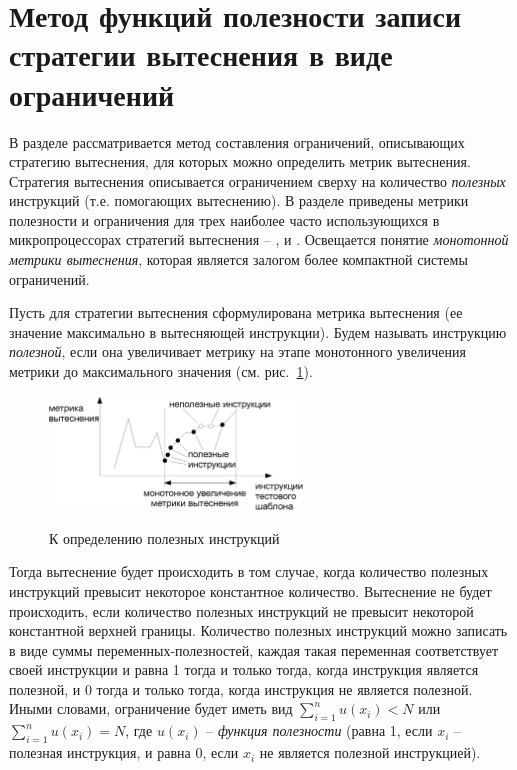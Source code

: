 
\pagebreak
\section{Метод функций полезности записи стратегии вытеснения в виде
ограничений}

В разделе рассматривается метод составления ограничений, описывающих
стратегию вытеснения, для которых можно определить метрик
вытеснения. Стратегия вытеснения описывается ограничением сверху на
количество \emph{полезных} инструкций (т.е. помогающих вытеснению).
В разделе приведены метрики полезности и ограничения для трех
наиболее часто использующихся в микропроцессорах стратегий
вытеснения -- \LRU, \FIFO и \PseudoLRU. Освещается понятие
\emph{монотонной метрики вытеснения}, которая является залогом более
компактной системы ограничений.

Пусть для стратегии вытеснения сформулирована метрика вытеснения (ее
значение максимально в вытесняющей инструкции). Будем называть
инструкцию \emph{полезной}, если она увеличивает метрику на этапе
монотонного увеличения метрики до максимального значения (см.
рис.~\ref{useful}).

\begin{figure}[h] \center
  \includegraphics[width=0.6\textwidth]{2.theor/useful}\\
  \caption{К определению полезных инструкций}\label{useful}
\end{figure}

Тогда вытеснение будет происходить в том случае, когда количество
полезных инструкций превысит некоторое константное количество.
Вытеснение не будет происходить, если количество полезных инструкций
не превысит некоторой константной верхней границы. Количество
полезных инструкций можно записать в виде суммы
переменных-полезностей, каждая такая переменная соответствует своей
инструкции и равна 1 тогда и только тогда, когда инструкция является
полезной, и 0 тогда и только тогда, когда инструкция не является
полезной. Иными словами, ограничение будет иметь вид $\sum_{i=1}^n
u(x_i) < N$ или $\sum_{i=1}^n u(x_i) = N$, где $u(x_i)$ --
\emph{функция полезности} (равна 1, если $x_i$ -- полезная
инструкция, и равна 0, если $x_i$ не является полезной инструкцией).

